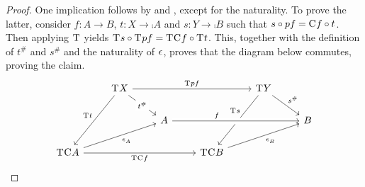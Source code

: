 \documentclass{lmcs} %
\theoremstyle{plain}\newtheorem{satz}[thm]{Satz} %
\begin{document}
			\begin{proof}
				One implication follows by  and , except for the naturality. To prove the latter, consider $f:A\to B$, $t:X\to\comp{}A$ and $s:Y\to\comp{}B$ such that $s\circ pf=\mathrm{C}^{}f\circ t$. Then applying $\mathrm{T}^{}$ yields $\mathrm{T}^{}s\circ\mathrm{T}^{}pf=\mathrm{T}^{}\mathrm{C}^{}f\circ\mathrm{T}^{}t$. This, together with the definition of $t^\#$ and $s^\#$ and the naturality of $\mathrm{\epsilon}^{}$, proves that the diagram below commutes, proving the claim.
				\[\begin{tikzcd}
					& {\term{}X} &&& {\term{}Y} & \\
					&& A &&& B \\
					{\term{}\comp{}A} &&& {\term{}\comp{}B}
					\arrow["{\term{}pf}", from=1-2, to=1-5]
					\arrow["{t^\#}"{description}, from=1-2, to=2-3]
					\arrow["{\term{}t}"', from=1-2, to=3-1]
					\arrow["{s^\#}", from=1-5, to=2-6]
					\arrow["{\term{}s}"', from=1-5, to=3-4, pos=0.4]
					\arrow["f", from=2-3, to=2-6, crossing over, pos=0.35]
					\arrow["{\coun{}_A}"', from=3-1, to=2-3]
					\arrow["{\term{}\comp{}f}"', from=3-1, to=3-4]
					\arrow["{\coun{}_B}"', from=3-4, to=2-6]
				\end{tikzcd}\]
				

\end{proof}
\end{document}
